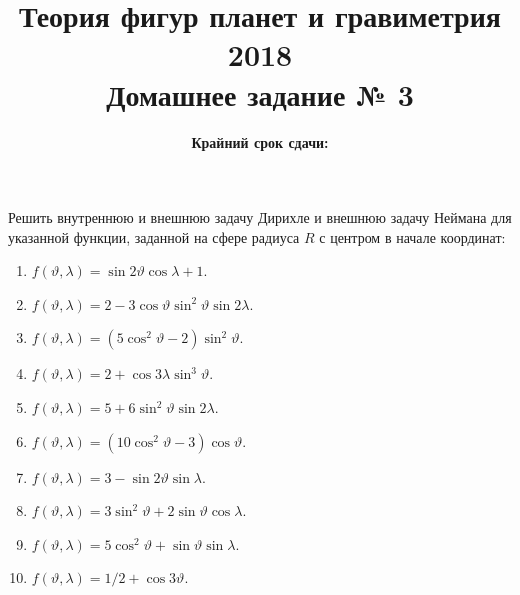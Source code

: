 \documentclass[11pt, a4paper,addpoints]{exam}
\title{{\Large Теория фигур планет и гравиметрия 2018}\\ 
    {\bf\Large Домашнее задание № 3}}
\author{}
\date{\normalsize\bf Крайний срок сдачи: \DTMusedate{deadline}}
\theoremstyle{remark}
\renewcommand{\theta}{\vartheta}
\begin{document}
\maketitle
\thispagestyle{empty}
\begin{questions}
    \question Решить внутреннюю и внешнюю задачу Дирихле и внешнюю задачу Неймана для указанной
    функции, заданной на сфере радиуса $R$ с центром в начале координат:    
    \begin{enumerate}
        \item $f\left( \theta, \lambda \right) = \sin{2\theta}\cos\lambda + 1$.
        \item $f\left( \theta, \lambda \right) = 2 - 3\cos{\theta}\sin^2{\theta}\sin{2\lambda}$.
        \item $f\left( \theta, \lambda \right) = (5\cos^2\theta - 2)\sin^2\theta$.
        \item $f\left( \theta, \lambda \right) = 2 + \cos{3\lambda}\sin^3\theta$.
        \item $f\left( \theta, \lambda \right) = 5 + 6\sin^2\theta\sin{2\lambda}$.
        \item $f\left( \theta, \lambda \right) = (10\cos^2\theta - 3)\cos{\theta}$.
        \item $f\left( \theta, \lambda \right) = 3 - \sin{2\theta}\sin{\lambda}$.
        \item $f\left( \theta, \lambda \right) = 3\sin^2\theta + 2\sin\theta\cos\lambda$.
        \item $f\left( \theta, \lambda \right) = 5\cos^2\theta + \sin\theta\sin{\lambda}$.
        \item $f\left( \theta, \lambda \right) = 1/2 + \cos{3\theta}$.
    \end{enumerate}
    \end{questions}
\end{document}
